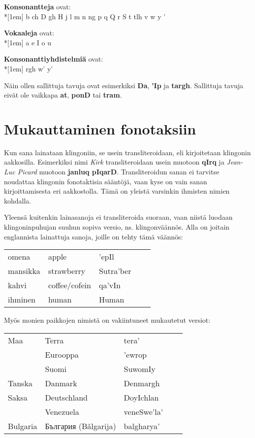 \documentclass{book}
\begin{document}
\textbf{Konsonantteja} ovat:\\*[1em]
b ch D gh H j l m n ng p q Q r S t tlh v w y '

\textbf{Vokaaleja} ovat:\\*[1em]
a e I o u

\textbf{Konsonanttiyhdistelmiä} ovat:\\*[1em]
rgh w' y'

Näin ollen sallittuja tavuja ovat esimerkiksi \textbf{Da}, \textbf{'Ip} ja \textbf{targh}. Sallittuja tavuja eivät ole vaikkapa \textbf{at}, \textbf{ponD} tai \textbf{tram}.

\section{Mukauttaminen fonotaksiin}

Kun sana lainataan klingoniin, se usein transliteroidaan, eli kirjoitetaan klingonin aakkosilla. Esimerkiksi nimi \textit{Kirk} transliteroidaan usein muotoon \textbf{qIrq} ja \textit{Jean-Luc Picard} muotoon \textbf{janluq pIqarD}. Transliteroidun sanan ei tarvitse noudattaa klingonin fonotaktisia sääntöjä, vaan kyse on vain sanan kirjoittamisesta eri aakkostolla. Tämä on yleistä varsinkin ihmisten nimien kohdalla.

Yleensä kuitenkin lainasanoja ei transliteroida suoraan, vaan niistä luodaan klingoninpuhujan suuhun sopiva versio, ns. klingonväännös. Alla on joitain englannista lainattuja sanoja, joille on tehty tämä väännös:

\begin{tabular}{l Il Bl}
    omena & apple & 'epIl \\
    mansikka & strawberry & Sutra'ber \\
    kahvi & coffee/cofein & qa'vIn \\
    ihminen & human & Human \\
\end{tabular}

Myös monien paikkojen nimistä on vakiintuneet mukautetut versiot:

\begin{tabular}{l Il Bl}
    Maa & Terra & tera' \\
    & Eurooppa & 'ewrop \\
    & Suomi & SuwomIy \\
    Tanska & Danmark & Denmargh \\
    Saksa & Deutschland & DoyIchlan \\
    & Venezuela & veneSwe'la' \\
    Bulgaria & България (Bǎlgarija) & balgharya' \\
\end{tabular}
\end{document}
